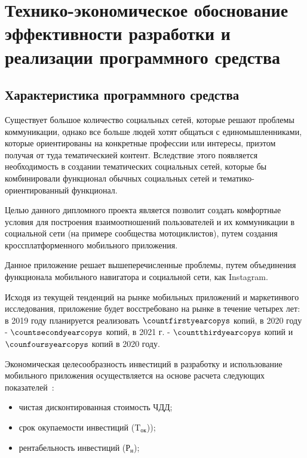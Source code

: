 


\section{Технико-экономическое обоснование эффективности разработки и реализации программного средства}
\label{sec:economics}

\subsection{Характеристика программного средства}
\label{sec:economics:description}

Существует большое количество социальных сетей, которые решают проблемы коммуникации, однако все больше людей хотят общаться с единомышленниками, которые ориентированы на конкретные профессии или интересы, приэтом получая от туда тематическией контент.
Вследствие этого появляется необходимость в создании тематических социальных сетей, которые бы комбинировали функционал обычных социальных сетей и тематико-ориентированный функционал.

Целью данного дипломного проекта является позволит создать комфортные условия для построения взаимоотношений пользователей и их коммуникации в социальной сети (на примере сообщества мотоциклистов), 
путем создания кроссплатформенного мобильного приложения.

Данное приложение решает вышеперечисленные проблемы, путем объединения функционала мобильного навигатора и социальной сети, как Instagram.

Исходя из текущей тенденций на рынке мобильных приложений и маркетинвого исследования, приложение будет восстребовано на рынке в течение четырех лет:
в 2019 году планируется реализовать $ \countfirstyearcopys $ копий, в 2020 году - $ \countsecondyearcopys $ копий, в 2021 г. - $ \countthirdyearcopys $ копий и $ \counfoursyearcopys $ копий в 2020 году.

Экономическая целесообразность инвестиций в разработку и использование мобильного приложения осуществляется на основе расчета следующих показателей~\cite{nosenko}:
\begin{itemize}
	\item чистая дисконтированная стоимость ЧДД;
	\item срок окупаемости инвестиций ($ \text{T}_\text{ок} $));
	\item рентабельность инвестиций ($ \text{Р}_\text{н} $);
\end{itemize}

